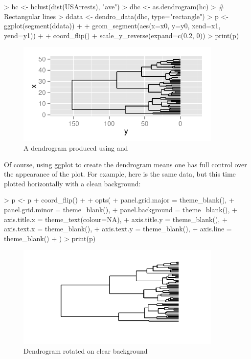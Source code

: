 \documentclass[10pt,oneside]{article}
\begin{document}
\begin{Schunk}
\begin{Sinput}
> hc <- hclust(dist(USArrests), "ave")
> dhc <- as.dendrogram(hc)
> # Rectangular lines
> ddata <- dendro_data(dhc, type="rectangle")
> p <- ggplot(segment(ddata)) + 
+     geom_segment(aes(x=x0, y=y0, xend=x1, yend=y1)) + 
+     coord_flip() + scale_y_reverse(expand=c(0.2, 0))
> print(p)
\end{Sinput}
\end{Schunk}

\begin{figure}[h]
\begin{center}
\includegraphics[width=4in, height=2in]{ggdendro-dendro1}
\end{center}
\caption{A dendrogram produced using \dendrodata{} and }
\end{figure}


Of course, using ggplot to create the dendrogram means one has full control over the appearance of the plot.  For example, here is the same data, but this time plotted horizontally with a clean background:

\begin{Schunk}
\begin{Sinput}
> p <- p + coord_flip() +
+   opts(
+     panel.grid.major = theme_blank(),
+     panel.grid.minor = theme_blank(),
+     panel.background = theme_blank(),
+     axis.title.x = theme_text(colour=NA),
+     axis.title.y = theme_blank(),
+     axis.text.x = theme_blank(),
+     axis.text.y = theme_blank(),
+     axis.line = theme_blank()
+     )  
> print(p)
\end{Sinput}
\end{Schunk}

\begin{figure}[h]
\begin{center}
\includegraphics[width=4in, height=2in]{ggdendro-dendro2}
\end{center}
\caption{Dendrogram rotated on clear background}
\end{figure}
\end{document}
